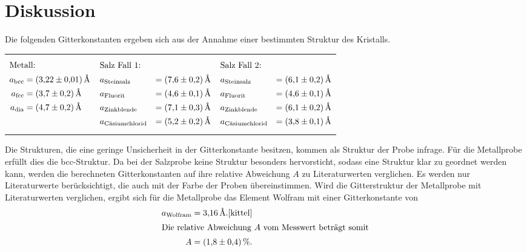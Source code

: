 \section{Diskussion}
\label{sec:Diskussion}
Die folgenden Gitterkonstanten ergeben sich aus der Annahme einer
bestimmten Struktur des Kristalls.
\FloatBarrier
\begin{table}
  \centering
\begin{tabular}{p{} p{} p{} }
{\begin{align*}
\intertext{Metall:}
a_{\mathrm{bcc}}&=\SI{3.22(1)}{\angstrom}\\
a_{\mathrm{fcc}}&=\SI{3.7(2)}{\angstrom}\\
a_{\mathrm{dia}}&=\SI{4.7(2)}{\angstrom}
\end{align*}}
&
{\begin{align*}
\intertext{Salz Fall 1:}
&a_{\text{Steinsalz}}&=\SI{7.6(2)}{\angstrom}\\
&a_{\text{Fluorit}}&=\SI{4.6(1)}{\angstrom}\\
&a_{\text{Zinkblende}}&=\SI{7.1(3)}{\angstrom}\\
&a_{\text{Cäsiumchlorid}} &=\SI{5.2(2)}{\angstrom}
\end{align*}}
&
{\begin{align*}
\intertext{Salz Fall 2:}
&a_{\text{Steinsalz}}&=\SI{6.1(2)}{\angstrom}\\
&a_{\text{Fluorit}}&=\SI{4.6(1)}{\angstrom}\\
&a_{\text{Zinkblende}}&=\SI{6.1(2)}{\angstrom}\\
&a_{\text{Cäsiumchlorid}} &=\SI{3.8(1)}{\angstrom}
\end{align*}}
\end{tabular}
\end{table}
\FloatBarrier
Die Strukturen, die eine geringe Unsicherheit in der Gitterkonstante besitzen,
kommen als Struktur der Probe infrage.
Für die Metallprobe erfüllt dies die bcc-Struktur.
Da bei der Salzprobe keine Struktur besonders hervorsticht, sodass
eine Struktur klar zu geordnet werden kann, werden die berechneten
Gitterkonstanten auf ihre relative Abweichung $A$ zu Literaturwerten verglichen.
Es werden nur Literaturwerte berücksichtigt, die auch mit der Farbe der Proben übereinstimmen.
Wird die Gitterstruktur der Metallprobe mit Literaturwerten
verglichen, ergibt sich für die Metallprobe das Element
Wolfram mit einer Gitterkonstante von
\begin{align*}
a_{\text{Wolfram}}=\SI{3.16}{\angstrom}.\text{\cite{kittel}} \\
\intertext{Die relative Abweichung $A$ vom Messwert beträgt somit}
A=\SI{1.8(4)}{\percent}.
\end{align*}

